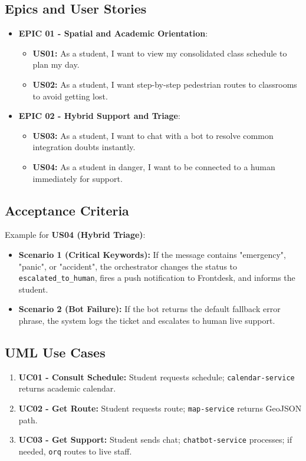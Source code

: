\subsection{Epics and User Stories}
\begin{itemize}
    \item \textbf{EPIC 01 - Spatial and Academic Orientation}:
    \begin{itemize}
        \item \textbf{\ac{US}01:} As a student, I want to view my consolidated class schedule to plan my day.
        \item \textbf{\ac{US}02:} As a student, I want step-by-step pedestrian routes to classrooms to avoid getting lost.
    \end{itemize}
    \item \textbf{EPIC 02 - Hybrid Support and Triage}:
    \begin{itemize}
        \item \textbf{\ac{US}03:} As a student, I want to chat with a bot to resolve common integration doubts instantly.
        \item \textbf{\ac{US}04:} As a student in danger, I want to be connected to a human immediately for support.
    \end{itemize}
\end{itemize}

\subsection{Acceptance Criteria}
Example for \textbf{\ac{US}04 (Hybrid Triage)}:
\begin{itemize}
    \item \textbf{Scenario 1 (Critical Keywords):} If the message contains "emergency", "panic", or "accident", the orchestrator changes the status to \texttt{escalated\_to\_human}, fires a push notification to Frontdesk, and informs the student.
    \item \textbf{Scenario 2 (Bot Failure):} If the bot returns the default fallback error phrase, the system logs the ticket and escalates to human live support.
\end{itemize}

\subsection{\ac{UML} Use Cases}
\begin{enumerate}
    \item \textbf{\ac{UC}01 - Consult Schedule:} Student requests schedule; \texttt{calendar-service} returns academic calendar.
    \item \textbf{\ac{UC}02 - Get Route:} Student requests route; \texttt{map-service} returns \ac{GeoJSON} path.
    \item \textbf{\ac{UC}03 - Get Support:} Student sends chat; \texttt{chatbot-service} processes; if needed, \texttt{orq} routes to live staff.
\end{enumerate}


